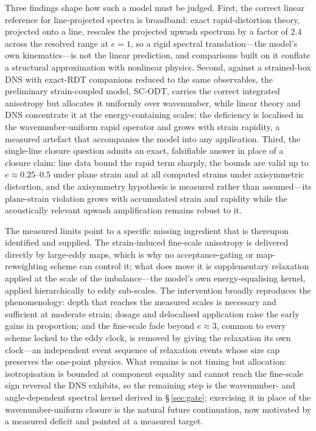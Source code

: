 \documentclass[lineno]{JFM-FLM_Au}
\begin{document}
Three findings shape how such a model must be judged. First, the
correct linear reference for line-projected spectra is broadband: exact
rapid-distortion theory, projected onto a line, rescales the
projected upwash spectrum by a factor of $2.4$ across the resolved range
at $e=1$, so a rigid spectral translation---the model's own
kinematics---is not the linear prediction, and comparisons built on it
conflate a structural approximation with nonlinear physics. Second,
against a strained-box DNS with exact-RDT companions reduced to the
same observables, the preliminary strain-coupled model, SC-ODT, carries
the correct integrated anisotropy but allocates it uniformly over wavenumber, while
linear theory and DNS concentrate it at the energy-containing scales;
the deficiency is localised in the wavenumber-uniform rapid operator
and grows with strain rapidity, a measured artefact that
accompanies the model into any application. Third, the single-line
closure question admits an exact, falsifiable answer in place of a
closure claim: line data bound the rapid term sharply, the bounds are
valid up to $e\approx0.25$--$0.5$ under plane strain and at all
computed strains under axisymmetric distortion, and the axisymmetry
hypothesis is measured rather than assumed---its plane-strain violation
grows with accumulated strain and rapidity while the acoustically
relevant upwash amplification remains robust to it.

The measured limits point to a specific missing ingredient that is thereupon identified and supplied. The strain-induced fine-scale
anisotropy is delivered directly by large-eddy maps, which is why no
acceptance-gating or map-reweighting scheme can control it; what does
move it is supplementary relaxation applied at the scale of the imbalance---the
model's own energy-equalising kernel, applied hierarchically to eddy
sub-scales. The intervention broadly reproduces the phenomenology: depth that reaches the measured scales is necessary and
sufficient at moderate strain; dosage and delocalised application
raise the early gains in proportion; and the fine-scale fade beyond
$e\approx3$, common to every scheme locked to the eddy clock, is
removed by giving the relaxation its own clock---an independent event sequence
of relaxation events whose size cap preserves the one-point
physics. What remains is not timing but allocation: isotropisation is
bounded at component equality and cannot reach the fine-scale sign
reversal the DNS exhibits, so the remaining step is the
wavenumber- and angle-dependent spectral kernel derived in
\S\,\ref{sec:gate}; exercising it in place of the wavenumber-uniform
closure is the natural future continuation, now motivated by a measured
deficit and pointed at a measured target.
\end{document}

